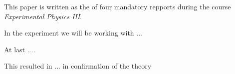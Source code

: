 This paper is written as the \emph{\repportnumber} of four mandatory repports
during the course \emph{Experimental Physics III}.

In the experiment we will be working with ... 

At last ....

This resulted in ...
in confirmation of the theory
